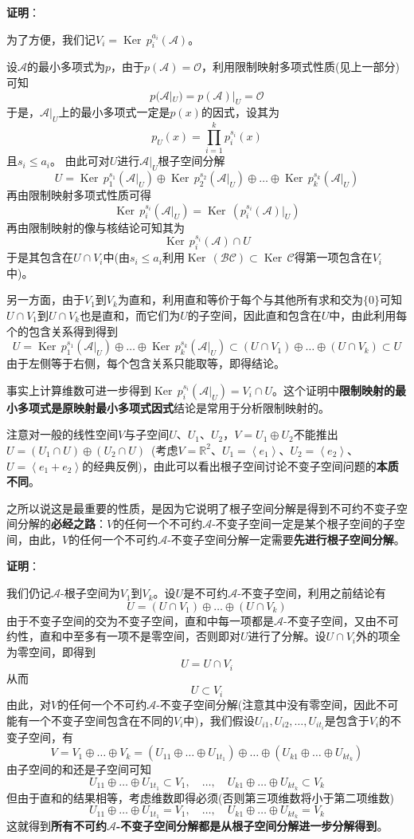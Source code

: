\documentclass[a4paper,UTF8,fontset=windows,AutoFakeBold]{ctexart}
\DeclareMathOperator{\Ker}{Ker\,}
\newcommand*{\ma}{\mathcal{A}}
\newcommand*{\mb}{\mathcal{B}}
\newcommand*{\mc}{\mathcal{C}}
\newcommand*{\mo}{\mathcal{O}}
\newcommand*{\note}{\noindent *}
\newcommand{\proo}[1]{{\vspace{5pt}\kaishu\noindent\textbf{证明}：\vspace{-3pt}
\begin{compactitem}
    \item[] #1
\end{compactitem}
}}
\begin{document}
\proo{
    为了方便，我们记$V_i=\Ker p_i^{a_i}(\ma)$。

    设$\ma$的最小多项式为$p$，由于$p(\ma)=\mo$，利用限制映射多项式性质(见上一部分)可知
    $$p(\ma|_U)=p(\ma)|_U=\mo$$
    于是，$\ma|_U$上的最小多项式一定是$p(x)$的因式，设其为
    $$p_U(x)=\prod_{i=1}^kp_i^{s_i}(x)$$
    且$s_i\le a_i$。
    由此可对$U$进行$\ma|_U$根子空间分解
    $$U=\Ker p_1^{s_1}(\ma|_U)\oplus\Ker p_2^{s_2}(\ma|_U)\oplus\dots\oplus\Ker p_k^{s_k}(\ma|_U)$$
    再由限制映射多项式性质可得
    $$\Ker p_i^{s_i}(\ma|_U)=\Ker(p_i^{s_i}(\ma)|_U)$$
    再由限制映射的像与核结论可知其为
    $$\Ker p_i^{s_i}(\ma)\cap U$$
    于是其包含在$U\cap V_i$中(由$s_i\le a_i$利用$\Ker(\mb\mc)\subset\Ker\mc$得第一项包含在$V_i$中)。

    另一方面，由于$V_1$到$V_k$为直和，利用直和等价于每个与其他所有求和交为$\{0\}$可知$U\cap V_1$到$U\cap V_k$也是直和，而它们为$U$的子空间，因此直和包含在$U$中，由此利用每个的包含关系得到得到
    $$U=\Ker p_1^{s_1}(\ma|_U)\oplus\dots\oplus\Ker p_k^{s_k}(\ma|_U)\subset(U\cap V_1)\oplus\dots\oplus(U\cap V_k)\subset U$$
    由于左侧等于右侧，每个包含关系只能取等，即得结论。

    \note 事实上计算维数可进一步得到$\Ker p_i^{s_i}(\ma|_U)=V_i\cap U$。这个证明中\textbf{限制映射的最小多项式是原映射最小多项式因式}结论是常用于分析限制映射的。
}

\note 注意对一般的线性空间$V$与子空间$U$、$U_1$、$U_2$，$V=U_1\oplus U_2$不能推出$U=(U_1\cap U)\oplus(U_2\cap U)$\ (考虑$V=\mathbb{R}^2$、$U_1=\left<e_1\right>$、$U_2=\left<e_2\right>$、$U=\left<e_1+e_2\right>$的经典反例)，由此可以看出根子空间讨论不变子空间问题的\textbf{本质不同}。

之所以说这是最重要的性质，是因为它说明了根子空间分解是得到不可约不变子空间分解的\textbf{必经之路}：$V$的任何一个不可约$\ma$-不变子空间一定是某个根子空间的子空间，由此，$V$的任何一个不可约$\ma$-不变子空间分解一定需要\textbf{先进行根子空间分解}。

\proo{
    我们仍记$\ma$-根子空间为$V_1$到$V_k$。设$U$是不可约$\ma$-不变子空间，利用之前结论有
    $$U=(U\cap V_1)\oplus\dots\oplus(U\cap V_k)$$
    由于不变子空间的交为不变子空间，直和中每一项都是$\ma$-不变子空间，又由不可约性，直和中至多有一项不是零空间，否则即对$U$进行了分解。设$U\cap V_i$外的项全为零空间，即得到
    $$U=U\cap V_i$$
    从而
    $$U\subset V_i$$
    由此，对$V$的任何一个不可约$\ma$-不变子空间分解(注意其中没有零空间，因此不可能有一个不变子空间包含在不同的$V_i$中)，我们假设$U_{i1},U_{i2},\dots,U_{it_i}$是包含于$V_i$的不变子空间，有
    $$V=V_1\oplus\dots\oplus V_k=(U_{11}\oplus\dots\oplus U_{1t_1})\oplus\dots\oplus(U_{k1}\oplus\dots\oplus U_{kt_k})$$
    由子空间的和还是子空间可知
    $$U_{11}\oplus\dots\oplus U_{1t_1}\subset V_1,\quad\dots,\quad U_{k1}\oplus\dots\oplus U_{kt_k}\subset V_k$$
    但由于直和的结果相等，考虑维数即得必须(否则第三项维数将小于第二项维数)
    $$U_{11}\oplus\dots\oplus U_{1t_1}=V_1,\quad\dots,\quad U_{k1}\oplus\dots\oplus U_{kt_k}=V_k$$
    这就得到\textbf{所有不可约$\ma$-不变子空间分解都是从根子空间分解进一步分解得到}。
}
\end{document}
